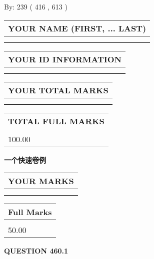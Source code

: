 \documentclass{ctexart}
\begin{document}
   
\hspace{1.0in} By: 
 239 ( 416 ,  613 )
   
   
   
   
\newpage 
\setcounter{page}{ 
   460001 } 
   
   
   
   
\noindent\begin{tabular}{|l|}
\hline
YOUR NAME (FIRST, ... LAST)  \\
\hline
 \\ 
 \\ 
\hline
\end{tabular}
\hspace{0.05in} \begin{tabular}{|l|}
\hline
 YOUR   ID   INFORMATION  \\
\hline
 \\ 
 \\ 
\hline
\end{tabular}
   
   
\vspace{0.2in}\noindent\begin{tabular}{|l|}
\hline
YOUR TOTAL MARKS  \\
\hline
 \\ 
 \\ 
\hline
\end{tabular}
\hspace{0.05in} \begin{tabular}{|l|}
\hline
TOTAL FULL MARKS  \\
\hline
 \\ 
100.00 \\
\hline
\end{tabular}
   
   
 \vspace{0.2in}
{\LARGE {\textbf{ 一个快速卷例}}}
   
   
  
\vspace{0.2in}
  
\noindent\begin{tabular}{|l|}
\hline
 YOUR MARKS  \\
\hline
 \\ 
 \\ 
\hline
\end{tabular}
\hspace{0.05in} \begin{tabular}{|l|}
\hline
 Full Marks  \\
\hline
 \\ 
50.00 \\
\hline
\end{tabular}
{\textbf{\Large{QUESTION
460.1 
}}}
  
\end{document}
